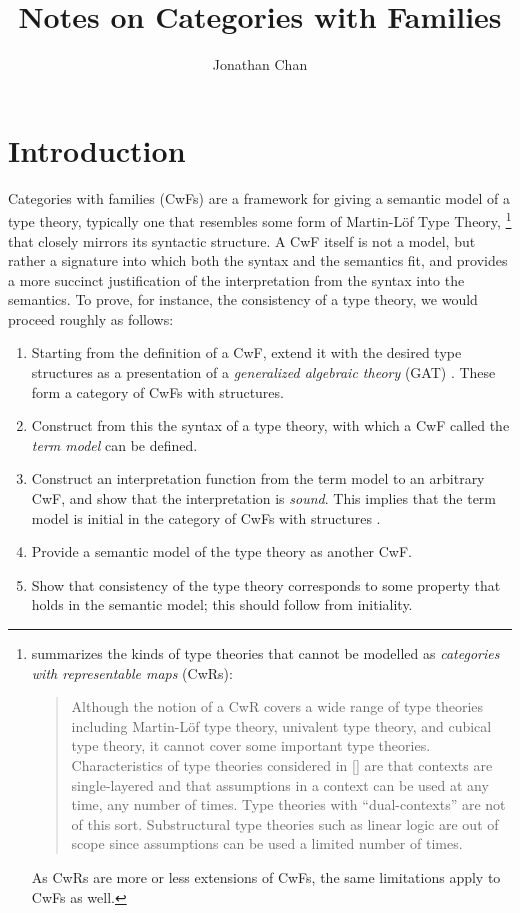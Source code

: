 \documentclass{article}
\title{Notes on Categories with Families}
\author{Jonathan Chan}
\renewcommand{\_}{\textrm{\textscale{.5}{\textunderscore}}}
\newlength{\punctwidth}
\newcommand{\punctstack}[1]{#1%
  \settowidth{\punctwidth}{#1}%
  \hspace*{-\the\punctwidth}%
}
\theoremstyle{definition}
\theoremstyle{plain}
\begin{document}
\maketitle

\tableofcontents
\clearpage

\section{Introduction}

Categories with families (CwFs) \citep{itt} are a framework for giving a semantic model of a type theory,
typically one that resembles some form of Martin-L\"of Type Theory\punctstack{,}%
\footnote{\citet{actt} summarizes the kinds of type theories that cannot be modelled as \emph{categories with representable maps} (CwRs):
\begin{quote}
    Although the notion of a CwR covers a wide range of type theories including Martin-L\"of type theory,
    univalent type theory, and cubical type theory, it cannot cover some important type theories.
    Characteristics of type theories considered in [\citet{actt}] are that contexts are single-layered
    and that assumptions in a context can be used at any time, any number of times.
    Type theories with “dual-contexts” are not of this sort.
    Substructural type theories such as linear logic are out of scope since assumptions can be used a limited number of times.
\end{quote}
As CwRs are more or less extensions of CwFs, the same limitations apply to CwFs as well.}
that closely mirrors its syntactic structure.
A CwF itself is not a model,
but rather a signature into which both the syntax and the semantics fit,
and provides a more succinct justification of the interpretation from the syntax into the semantics.
To prove, for instance, the consistency of a type theory,
we would proceed roughly as follows:

\begin{enumerate}
    \item Starting from the definition of a CwF,
    extend it with the desired type structures as a presentation of
    a \emph{generalized algebraic theory} (GAT) \citep{gat}.
    These form a category of CwFs with structures.
    \item Construct from this the syntax of a type theory,
    with which a CwF called the \emph{term model} can be defined.
    \item Construct an interpretation function from the term model to an arbitrary CwF,
    and show that the interpretation is \emph{sound}.
    This implies that the term model is initial in the category of CwFs with structures \citep{gatcwf}.
    \item Provide a semantic model of the type theory as another CwF.
    \item Show that consistency of the type theory corresponds to some property that holds in the semantic model;
    this should follow from initiality.
\end{enumerate}
\end{document}
